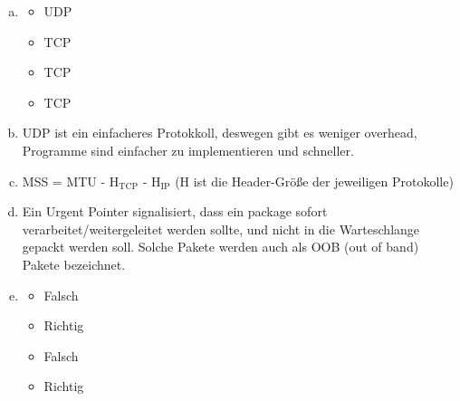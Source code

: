 

\usepackage{multicol,tabularx}
\usepackage{graphicx}
\usepackage{float}
\renewcommand{\arraystretch}{1.5}

\usepackage{caption}
\usepackage{subcaption}

\date{Mittwoch 11.12.2019}


\newcommand\seq[2]{\addplot [->,blue] coordinates 	{(0,#1) (1,#1 -0.5)} node[left,pos=0] {SEQ-Nr=#2};}
\newcommand\seqt[3]{\addplot [->,blue] coordinates 	{(0,#1) (1,#1 -#2)} node[left,pos=0] {SEQ-Nr=#3};}
\newcommand\ack[2]{\addplot [->,orange] coordinates 	{(1,#1) (0,#1 - 0.5)} node[right,pos=0] {ACK-Nr=#2};}
\newcommand\ackt[3]{\addplot [->,orange] coordinates 	{(1,#1) (0,#1 - #2)} node[right,pos=0] {ACK-Nr=#3};}
\newcommand\ackb[2]{\addplot [->,red] coordinates 	{(1,#1) (0.5,#1 - 0.25)} node[right,pos=0] {ACK-Nr=#2} node[left,pos=1] {\large{\Lightning}};}


\maketitle
\thispagestyle{fancy}


\begin{enumerate}[a)]
	\item \begin{itemize}
		\item UDP
		\item TCP
		\item TCP
		\item TCP
	\end{itemize}

	\item UDP ist ein einfacheres Protokkoll, deswegen gibt es weniger overhead, Programme sind einfacher zu implementieren und schneller.
	\item MSS = MTU - $\text{H}_\text{TCP}$ - $\text{H}_\text{IP}$ (H ist die Header-Größe der jeweiligen Protokolle)
	\item Ein Urgent Pointer signalisiert, dass ein package sofort verarbeitet/weitergeleitet werden sollte, und nicht in die Warteschlange gepackt werden soll. Solche Pakete werden auch als OOB (out of band) Pakete bezeichnet.
	\item \begin{itemize}
		\item Falsch
		\item Richtig
		\item Falsch
		\item Richtig
	\end{itemize}
\end{enumerate}


